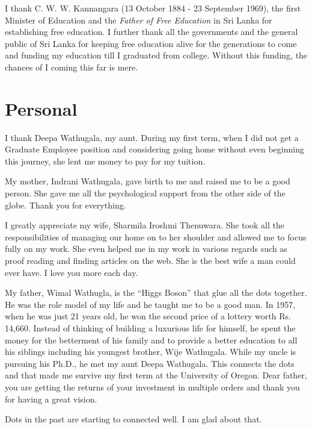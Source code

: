 \par
I thank C. W. W. Kannangara (13 October 1884 - 23 September 1969), the first Minister of Education and the \textit{Father of Free Education} in Sri Lanka for establishing free education. I further thank all the governments and the general public of Sri Lanka for keeping free education alive for the generations to come and funding my education till I graduated from college. Without this funding, the chances of I coming this far is mere.


\section*{Personal}

\par
I thank Deepa Wathugala, my aunt. During my first term, when I did not get a Graduate Employee position and considering going home without even beginning this journey, she lent me money to pay for my tuition.

\par
My mother, Indrani Wathugala, gave birth to me and raised me to be a good person. She gave me all the psychological support from the other side of the globe. Thank you for everything.

\par
I greatly appreciate my wife, Sharmila Iroshmi Thenuwara. She took all the responsibilities of managing our home on to her shoulder and allowed me to focus fully on my work. She even helped me in my work in various regards such as proof reading and finding articles on the web. She is the best wife a man could ever have. I love you more each day.

\par
My father, Wimal Wathugla, is the ``Higgs Boson'' that glue all the dots together. He was the role model of my life and he taught me to be a good man. In 1957, when he was just 21 years old, he won the second price of a lottery worth Rs. 14,660. Instead of thinking of building a luxurious life for himself, he spent the money for the betterment of his family and to provide a better education to all his siblings including his youngest brother, Wije Wathugala. While my uncle is pursuing his Ph.D., he met my aunt Deepa Wathugala. This connects the dots and that made me survive my first term at the University of Oregon. Dear father, you are getting the returns of your investment in multiple orders and thank you for having a great vision.

\par
Dots in the past are starting to connected well. I am glad about that.


\setcounter{tocdepth}{3}